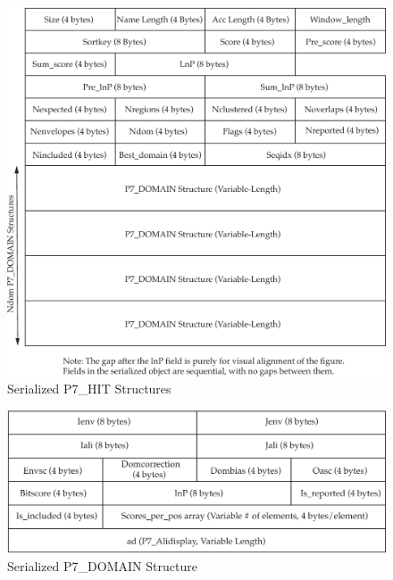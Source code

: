 \documentclass[notoc,justified]{tufte-book}    %
\begin{document}
\begin{figure}
\includegraphics[width=\textwidth]{inclusions/hit-serialize.pdf}
\caption{Serialized {P7\_HIT} Structures}
\label{fig:hit-serialize}
\end{figure}
\begin{figure}
\includegraphics[width=\textwidth]{inclusions/domain-serialize.pdf}
\caption{Serialized {P7\_DOMAIN} Structure}
\label{fig:domain-serialize}
\end{figure}
\end{document}
